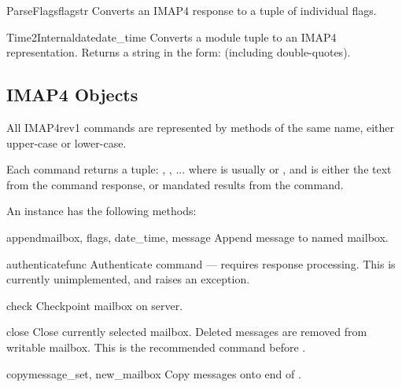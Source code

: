 \begin{funcdesc}{ParseFlags}{flagstr}
  Converts an IMAP4  response to a tuple of individual
  flags.
\end{funcdesc}

\begin{funcdesc}{Time2Internaldate}{date_time}
  Converts a  module tuple to an IMAP4
   representation.  Returns a string in the form:
   (including double-quotes).
\end{funcdesc}


\subsection{IMAP4 Objects}

All IMAP4rev1 commands are represented by methods of the same name,
either upper-case or lower-case.

Each command returns a tuple: \code{(}, \code{[},
...\code{])} where  is usually  or ,
and  is either the text from the command response, or
mandated results from the command.

An  instance has the following methods:


\begin{methoddesc}{append}{mailbox, flags, date_time, message}
  Append message to named mailbox. 
\end{methoddesc}

\begin{methoddesc}{authenticate}{func}
  Authenticate command --- requires response processing. This is
  currently unimplemented, and raises an exception. 
\end{methoddesc}

\begin{methoddesc}{check}{}
  Checkpoint mailbox on server. 
\end{methoddesc}

\begin{methoddesc}{close}{}
  Close currently selected mailbox. Deleted messages are removed from
  writable mailbox. This is the recommended command before
  .
\end{methoddesc}

\begin{methoddesc}{copy}{message_set, new_mailbox}
  Copy  messages onto end of . 
\end{methoddesc}

